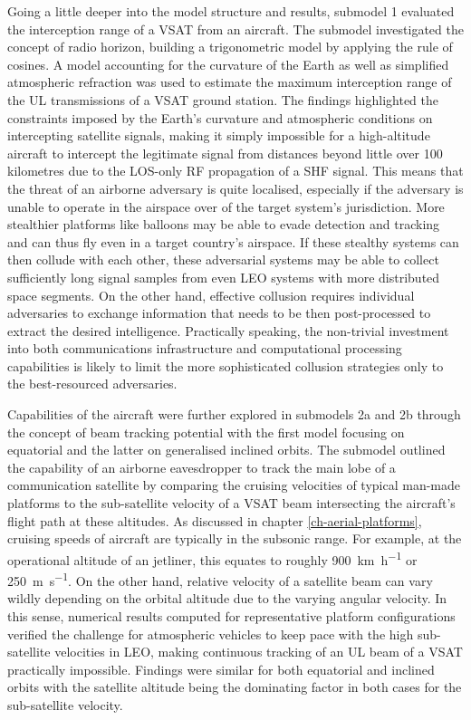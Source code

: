 \documentclass[english, 12pt, a4paper, elec, utf8, a-1b, online]{aaltothesis}
\begin{document}
Going a little deeper into the model structure and results, submodel 1 evaluated the interception range of a VSAT from an aircraft. The submodel investigated the concept of radio horizon, building a trigonometric model by applying the rule of cosines.
A model accounting for the curvature of the Earth as well as simplified atmospheric refraction was used to estimate the maximum interception range of the UL transmissions of a VSAT ground station. The findings highlighted the constraints imposed by the Earth's curvature and atmospheric conditions on intercepting satellite signals, making it simply impossible for a high-altitude aircraft to intercept the legitimate signal from distances beyond little over 100 kilometres due to the LOS-only RF propagation of a SHF signal.
This means that the threat of an airborne adversary is quite localised, especially if the adversary is unable to operate in the airspace over of the target system's jurisdiction. More stealthier platforms like balloons may be able to evade detection and tracking and can thus fly even in a target country's airspace. If these stealthy systems can then collude with each other, these adversarial systems may be able to collect sufficiently long signal samples from even LEO systems with more distributed space segments. On the other hand, effective collusion requires individual adversaries to exchange information that needs to be then post-processed to extract the desired intelligence. Practically speaking, the non-trivial investment into both communications infrastructure and computational processing capabilities is likely to limit the more sophisticated collusion strategies only to the best-resourced adversaries.

Capabilities of the aircraft were further explored in submodels 2a and 2b through the concept of beam tracking potential with the first model focusing on equatorial and the latter on generalised inclined orbits. The submodel outlined the capability of an airborne eavesdropper to track the main lobe of a communication satellite by comparing the cruising velocities of typical man-made platforms to the sub-satellite velocity of a VSAT beam intersecting the aircraft's flight path at these altitudes.
As discussed in chapter \ref{ch-aerial-platforms}, cruising speeds of aircraft are typically in the subsonic range.
For example, at the operational altitude of an jetliner, this equates to roughly \SI[per-mode=repeated-symbol]{900}{\kilo\meter\per\hour} or \SI[per-mode=repeated-symbol]{250}{\meter\per\second}.
On the other hand, relative velocity of a satellite beam can vary wildly depending on the orbital altitude due to the varying angular velocity.
In this sense, numerical results computed for representative platform configurations verified the challenge for atmospheric vehicles to keep pace with the high sub-satellite velocities in LEO, making continuous tracking of an UL beam of a VSAT practically impossible. Findings were similar for both equatorial and inclined orbits with the satellite altitude being the dominating factor in both cases for the sub-satellite velocity.
\end{document}
